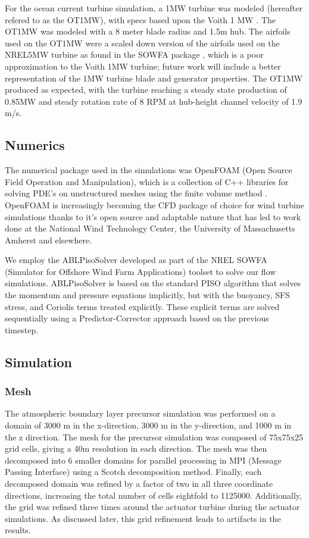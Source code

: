 For the ocean current turbine simulation, a 1MW turbine was modeled (hereafter refered to as the OT1MW), with specs based upon the Voith 1 MW \cite{Voith}. The OT1MW was modeled with a 8 meter blade radius and 1.5m hub. The airfoils used on the OT1MW were a scaled down version of the airfoils used on the NREL5MW turbine as found in the SOWFA package \cite{SOWFA}, which is a poor approximation to the Voith 1MW turbine; future work will include a better representation of the 1MW turbine blade and generator properties. The OT1MW produced as expected, with the turbine reaching a steady state production of 0.85MW and steady rotation rate of 8 RPM at hub-height channel velocity of 1.9 m/s.



\subsection{Numerics}


The numerical package used in the simulations was OpenFOAM (Open Source Field Operation and Manipulation), which is a collection of C++ libraries for solving PDE's on unstructured meshes using the finite volume method \cite{OpenFOAM}. OpenFOAM is increasingly becoming the CFD package of choice for wind turbine simulations thanks to it's open source and adaptable nature that has led to work done at the National Wind Technology Center, the University of Massachusetts Amherst and elsewhere.

We employ the ABLPisoSolver developed as part of the NREL SOWFA (Simulator for Offshore Wind Farm Applications) toolset \cite{SOWFA} to solve our flow simulations.  ABLPisoSolver is based on the standard PISO algorithm that solves the momentum and pressure equations implicitly, but with the buoyancy, SFS stress, and Coriolis terms treated explicitly.  These explicit terms are solved sequentially using a Predictor-Corrector approach based on the previous timestep.  

\subsection{Simulation}


\subsubsection{Mesh}

The atmospheric boundary layer precursor simulation was performed on a domain of 3000 m in the x-direction, 3000 m in the y-direction, and 1000 m in the z direction.  The mesh for the precursor simulation was composed of 75x75x25 grid cells, giving a 40m resolution in each direction.  The mesh was then decomposed into 6 smaller domains for parallel processing in MPI (Message Passing Interface) using a Scotch decomposition method.  Finally, each decomposed domain was refined by a factor of two in all three coordinate directions, increasing the total number of cells eightfold to 1125000.  Additionally, the grid was refined three times around the actuator turbine during the actuator simulations.  As discussed later, this grid refinement leads to artifacts in the results.

